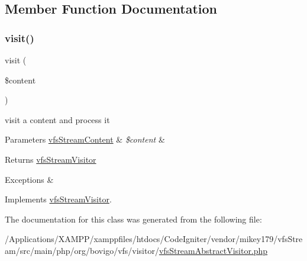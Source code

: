 \subsection{Member Function Documentation}
\mbox{\label{classorg_1_1bovigo_1_1vfs_1_1visitor_1_1vfs_stream_abstract_visitor_ad262024718e58f64d782ed2a392b0702}} 
\subsubsection{\texorpdfstring{visit()}{visit()}}
{\footnotesize\ttfamily visit (\begin{DoxyParamCaption}\item[{\mbox{\hyperlink{interfaceorg_1_1bovigo_1_1vfs_1_1vfs_stream_content}{vfs\+Stream\+Content}}}]{\$content }\end{DoxyParamCaption})}

visit a content and process it


\begin{DoxyParams}[1]{Parameters}
\mbox{\hyperlink{interfaceorg_1_1bovigo_1_1vfs_1_1vfs_stream_content}{vfs\+Stream\+Content}} & {\em \$content} & \\
\hline
\end{DoxyParams}
\begin{DoxyReturn}{Returns}
\mbox{\hyperlink{interfaceorg_1_1bovigo_1_1vfs_1_1visitor_1_1vfs_stream_visitor}{vfs\+Stream\+Visitor}} 
\end{DoxyReturn}

\begin{DoxyExceptions}{Exceptions}
{\em } & \\
\hline
\end{DoxyExceptions}


Implements \mbox{\hyperlink{interfaceorg_1_1bovigo_1_1vfs_1_1visitor_1_1vfs_stream_visitor_ad262024718e58f64d782ed2a392b0702}{vfs\+Stream\+Visitor}}.



The documentation for this class was generated from the following file\+:\begin{DoxyCompactItemize}
\item 
/\+Applications/\+X\+A\+M\+P\+P/xamppfiles/htdocs/\+Code\+Igniter/vendor/mikey179/vfs\+Stream/src/main/php/org/bovigo/vfs/visitor/\mbox{\hyperlink{vfs_stream_abstract_visitor_8php}{vfs\+Stream\+Abstract\+Visitor.\+php}}\end{DoxyCompactItemize}
